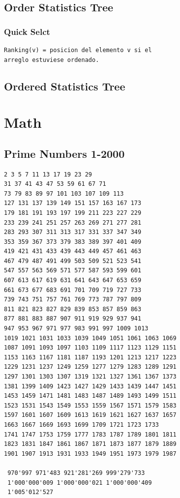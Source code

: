 \subsection{Order Statistics Tree}
\subsubsection{Quick Selct}
\begin{verbatim}
Ranking(v) = posicion del elemento v si el 
arreglo estuviese ordenado.
\end{verbatim}
\raggedbottom
\hrulefill
\subsection{Ordered Statistics Tree}
\raggedbottom
\hrulefill

\section{Math}
\subsection{Prime Numbers 1-2000}
\begin{verbatim}
2 3 5 7 11 13 17 19 23 29
31 37 41 43 47 53 59 61 67 71
73 79 83 89 97 101 103 107 109 113
127 131 137 139 149 151 157 163 167 173
179 181 191 193 197 199 211 223 227 229
233 239 241 251 257 263 269 271 277 281
283 293 307 311 313 317 331 337 347 349
353 359 367 373 379 383 389 397 401 409
419 421 431 433 439 443 449 457 461 463
467 479 487 491 499 503 509 521 523 541
547 557 563 569 571 577 587 593 599 601
607 613 617 619 631 641 643 647 653 659
661 673 677 683 691 701 709 719 727 733
739 743 751 757 761 769 773 787 797 809
811 821 823 827 829 839 853 857 859 863
877 881 883 887 907 911 919 929 937 941
947 953 967 971 977 983 991 997 1009 1013
1019 1021 1031 1033 1039 1049 1051 1061 1063 1069
1087 1091 1093 1097 1103 1109 1117 1123 1129 1151
1153 1163 1167 1181 1187 1193 1201 1213 1217 1223
1229 1231 1237 1249 1259 1277 1279 1283 1289 1291
1297 1301 1303 1307 1319 1321 1327 1361 1367 1373
1381 1399 1409 1423 1427 1429 1433 1439 1447 1451
1453 1459 1471 1481 1483 1487 1489 1493 1499 1511
1523 1531 1543 1549 1553 1559 1567 1571 1579 1583
1597 1601 1607 1609 1613 1619 1621 1627 1637 1657
1663 1667 1669 1693 1699 1709 1721 1723 1733
1741 1747 1753 1759 1777 1783 1787 1789 1801 1811
1823 1831 1847 1861 1867 1871 1873 1877 1879 1889
1901 1907 1913 1931 1933 1949 1951 1973 1979 1987

 970'997 971'483 921'281'269 999'279'733
 1'000'000'009 1'000'000'021 1'000'000'409 
 1'005'012'527
\end{verbatim}
\hrulefill
